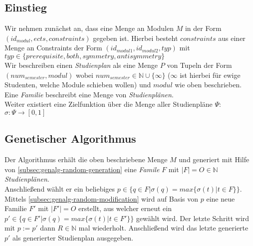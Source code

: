\documentclass[titlepage=true, parskip=full]{scrartcl}
\begin{document}
	\subsection{Einstieg}
Wir nehmen zunächst an, dass eine Menge an Modulen $M$ in der Form $(id_{modul}, ects, constraints)$ gegeben ist.
Hierbei besteht $constraints$ aus einer Menge an Constraints der Form $(id_{modul1}, id_{modul2}, typ)$ mit $typ \in \{prerequisite, both, symmetry, antisymmetry\}$\\
Wir beschreiben einen \textit{Studienplan} als eine Menge $P$ von Tupeln der Form $(num_{semester}, modul)$ wobei $num_{semester} \in \mathbb{N} \cup \{\infty\}$ ($\infty$ ist hierbei für ewige Studenten, welche Module schieben wollen) und $modul$ wie oben beschrieben. Eine \textit{Familie} beschreibt eine Menge von \textit{Studienplänen}.\\
Weiter existiert eine Zielfunktion über die Menge aller Studienpläne $\Psi$: $\sigma\colon \Psi \to [0,1]$
	\subsection{Genetischer Algorithmus}
Der Algorithmus erhält die oben beschriebene Menge $M$ und generiert mit Hilfe von  \ref{subsec:genalg-random-generation} eine \textit{Famile} $F$ mit $|F| = O \in \mathbb{N}$ \textit{Studienplänen}.\\
Anschließend wählt er ein beliebiges $p \in \{q \in F | \sigma(q)=max \{\sigma(t)|t \in F \} \}$.\\
Mittels \ref{subsec:genalg-random-modification} wird auf Basis von $p$ eine neue Familie $F'$ mit $|F'| = O$ erstellt, aus welcher erneut ein $p' \in \{q \in F' | \sigma(q)=max \{\sigma(t)|t \in F' \} \}$ gewählt wird. Der letzte Schritt wird mit $p := p'$ dann $R \in \mathbb{N}$ mal wiederholt.
Anschließend wird das letzte generierte $p'$ als generierter Studienplan ausgegeben.
\end{document}

